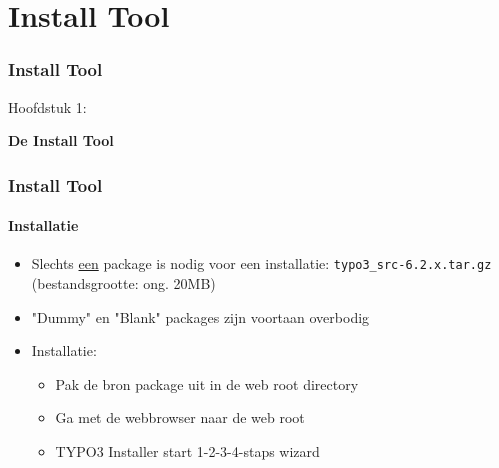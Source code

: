%

\section{Install Tool}
\begin{frame}[fragile]
	\frametitle{Install Tool}

	\begin{center}\huge{Hoofdstuk 1:}\end{center}
	\begin{center}\huge{\color{typo3darkgrey}\textbf{De Install Tool}}\end{center}

\end{frame}


\begin{frame}[fragile]
	\frametitle{Install Tool}
	\framesubtitle{Installatie}

	\begin{itemize}
		\item Slechts \underline{een} package is nodig voor een installatie:\newline
				\texttt{typo3\_src-6.2.x.tar.gz} (bestandsgrootte: ong. 20MB)
		\item "Dummy" en "Blank" packages zijn voortaan overbodig
		\item Installatie:
			\begin{itemize}
				\item Pak de bron package uit in de web root directory
				\item Ga met de webbrowser naar de web root
				\item TYPO3 Installer start 1-2-3-4-staps wizard
			\end{itemize}

	\end{itemize}

\end{frame}

